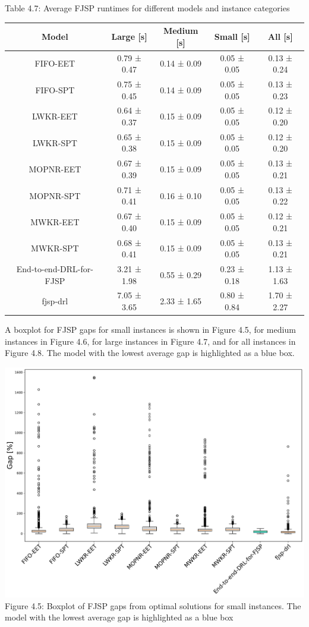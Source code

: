 \begin{table}
    Table 4.7: Average FJSP runtimes for different models and instance categories\\
    \vspace{1mm}
    \label{table:4.5}
    \footnotesize 
    \begin{tabular}{ccccc}
        \toprule
        Model & Large [s] & Medium [s] & Small [s] & All [s] \\
        \midrule
        FIFO-EET & 0.79 ± 0.47 & 0.14 ± 0.09 & 0.05 ± 0.05 & 0.13 ± 0.24 \\
        FIFO-SPT & 0.75 ± 0.45 & 0.14 ± 0.09 & 0.05 ± 0.05 & 0.13 ± 0.23 \\
        LWKR-EET & 0.64 ± 0.37 & 0.15 ± 0.09 & 0.05 ± 0.05 & 0.12 ± 0.20 \\
        LWKR-SPT & 0.65 ± 0.38 & 0.15 ± 0.09 & 0.05 ± 0.05 & 0.12 ± 0.20 \\
        MOPNR-EET & 0.67 ± 0.39 & 0.15 ± 0.09 & 0.05 ± 0.05 & 0.13 ± 0.21 \\
        MOPNR-SPT & 0.71 ± 0.41 & 0.16 ± 0.10 & 0.05 ± 0.05 & 0.13 ± 0.22 \\
        MWKR-EET & 0.67 ± 0.40 & 0.15 ± 0.09 & 0.05 ± 0.05 & 0.12 ± 0.21 \\
        MWKR-SPT & 0.68 ± 0.41 & 0.15 ± 0.09 & 0.05 ± 0.05 & 0.13 ± 0.21 \\
        End-to-end-DRL-for-FJSP & 3.21 ± 1.98 & 0.55 ± 0.29 & 0.23 ± 0.18 & 1.13 ± 1.63 \\
        fjsp-drl & 7.05 ± 3.65 & 2.33 ± 1.65 & 0.80 ± 0.84 & 1.70 ± 2.27 \\
        \bottomrule
    \end{tabular}
\end{table}


A boxplot for FJSP gaps for small instances is shown in Figure 4.5, for medium instances in Figure 4.6, for large instances in Figure 4.7, and for all instances in Figure 4.8. The model with the lowest average gap is highlighted as a blue box.

\begin{center}
    \includegraphics[width=0.8\linewidth]{images/horizontal_boxplot_fjsp_small.pdf}\\
    Figure 4.5: Boxplot of FJSP gaps from optimal solutions for small instances. The model with the lowest average gap is highlighted as a blue box
\end{center}

